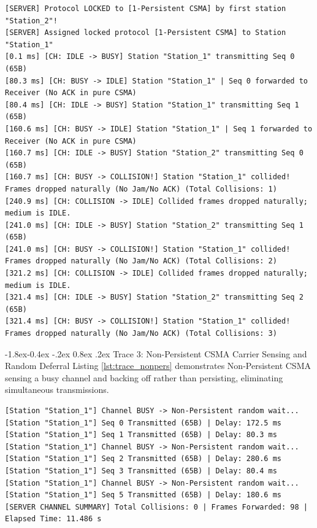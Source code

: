 \documentclass[11pt,a4paper]{article}
\makeatletter
\renewcommand\subsection{\@startsection{subsection}{2}{\z@}%
                                     {-1.8ex\@plus -0.4ex \@minus -.2ex}%
                                     {0.8ex \@plus .2ex}%
                                     {\normalfont\large\bfseries}}
\makeatother
\begin{document}
\begin{lstlisting}[style=tracestyle, caption={Live socket execution transcript: 1-Persistent CSMA collision cascade.}, label={lst:trace_1pers}]
[SERVER] Protocol LOCKED to [1-Persistent CSMA] by first station "Station_2"!
[SERVER] Assigned locked protocol [1-Persistent CSMA] to Station "Station_1"
[0.1 ms] [CH: IDLE -> BUSY] Station "Station_1" transmitting Seq 0 (65B)
[80.3 ms] [CH: BUSY -> IDLE] Station "Station_1" | Seq 0 forwarded to Receiver (No ACK in pure CSMA)
[80.4 ms] [CH: IDLE -> BUSY] Station "Station_1" transmitting Seq 1 (65B)
[160.6 ms] [CH: BUSY -> IDLE] Station "Station_1" | Seq 1 forwarded to Receiver (No ACK in pure CSMA)
[160.7 ms] [CH: IDLE -> BUSY] Station "Station_2" transmitting Seq 0 (65B)
[160.7 ms] [CH: BUSY -> COLLISION!] Station "Station_1" collided! Frames dropped naturally (No Jam/No ACK) (Total Collisions: 1)
[240.9 ms] [CH: COLLISION -> IDLE] Collided frames dropped naturally; medium is IDLE.
[241.0 ms] [CH: IDLE -> BUSY] Station "Station_2" transmitting Seq 1 (65B)
[241.0 ms] [CH: BUSY -> COLLISION!] Station "Station_1" collided! Frames dropped naturally (No Jam/No ACK) (Total Collisions: 2)
[321.2 ms] [CH: COLLISION -> IDLE] Collided frames dropped naturally; medium is IDLE.
[321.4 ms] [CH: IDLE -> BUSY] Station "Station_2" transmitting Seq 2 (65B)
[321.4 ms] [CH: BUSY -> COLLISION!] Station "Station_1" collided! Frames dropped naturally (No Jam/No ACK) (Total Collisions: 3)
\end{lstlisting}

\subsection{Trace 3: Non-Persistent CSMA Carrier Sensing and Random Deferral}
Listing \ref{lst:trace_nonpers} demonstrates Non-Persistent CSMA sensing a busy channel and backing off rather than persisting, eliminating simultaneous transmissions.

\begin{lstlisting}[style=tracestyle, caption={Live socket execution transcript: Non-Persistent CSMA channel deferral.}, label={lst:trace_nonpers}]
[Station "Station_1"] Channel BUSY -> Non-Persistent random wait...
[Station "Station_1"] Seq 0 Transmitted (65B) | Delay: 172.5 ms
[Station "Station_1"] Seq 1 Transmitted (65B) | Delay: 80.3 ms
[Station "Station_1"] Channel BUSY -> Non-Persistent random wait...
[Station "Station_1"] Seq 2 Transmitted (65B) | Delay: 280.6 ms
[Station "Station_1"] Seq 3 Transmitted (65B) | Delay: 80.4 ms
[Station "Station_1"] Channel BUSY -> Non-Persistent random wait...
[Station "Station_1"] Seq 5 Transmitted (65B) | Delay: 180.6 ms
[SERVER CHANNEL SUMMARY] Total Collisions: 0 | Frames Forwarded: 98 | Elapsed Time: 11.486 s
\end{lstlisting}
\end{document}
